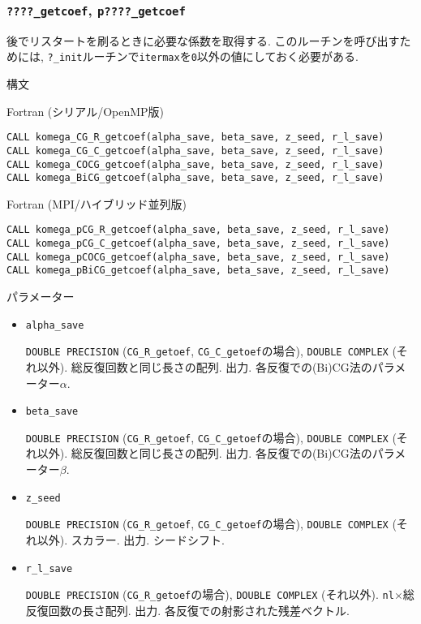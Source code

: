 \documentclass[12pt,titlepage]{jarticle}
\begin{document}
\subsubsection{\texttt{????\_getcoef}, \texttt{p????\_getcoef}}

後でリスタートを刷るときに必要な係数を取得する.
このルーチンを呼び出すためには,
\verb|?_init|ルーチンで\verb|itermax|を\verb|0|以外の値にしておく必要がある.

\noindent 構文

\noindent Fortran (シリアル/OpenMP版)
\begin{verbatim}
CALL komega_CG_R_getcoef(alpha_save, beta_save, z_seed, r_l_save)
CALL komega_CG_C_getcoef(alpha_save, beta_save, z_seed, r_l_save)
CALL komega_COCG_getcoef(alpha_save, beta_save, z_seed, r_l_save)
CALL komega_BiCG_getcoef(alpha_save, beta_save, z_seed, r_l_save)
\end{verbatim}

\noindent Fortran (MPI/ハイブリッド並列版)
\begin{verbatim}
CALL komega_pCG_R_getcoef(alpha_save, beta_save, z_seed, r_l_save)
CALL komega_pCG_C_getcoef(alpha_save, beta_save, z_seed, r_l_save)
CALL komega_pCOCG_getcoef(alpha_save, beta_save, z_seed, r_l_save)
CALL komega_pBiCG_getcoef(alpha_save, beta_save, z_seed, r_l_save)
\end{verbatim}

\noindent パラメーター

\begin{itemize}
\item \verb|alpha_save|

  \verb|DOUBLE PRECISION| (\verb|CG_R_getoef|, \verb|CG_C_getoef|の場合),
  \verb|DOUBLE COMPLEX| (それ以外).
  総反復回数と同じ長さの配列. 出力. 各反復での(Bi)CG法のパラメーター$\alpha$.

\item \verb|beta_save|

  \verb|DOUBLE PRECISION| (\verb|CG_R_getoef|, \verb|CG_C_getoef|の場合),
  \verb|DOUBLE COMPLEX| (それ以外).
  総反復回数と同じ長さの配列. 出力. 各反復での(Bi)CG法のパラメーター$\beta$.

\item \verb|z_seed|

  \verb|DOUBLE PRECISION| (\verb|CG_R_getoef|, \verb|CG_C_getoef|の場合),
  \verb|DOUBLE COMPLEX| (それ以外).
  スカラー. 出力. シードシフト.

\item \verb|r_l_save|
  
  \verb|DOUBLE PRECISION| (\verb|CG_R_getoef|の場合),
  \verb|DOUBLE COMPLEX| (それ以外).
  \verb|nl|$\times$総反復回数の長さ配列. 出力.
  各反復での射影された残差ベクトル.
\end{itemize}
\end{document}
